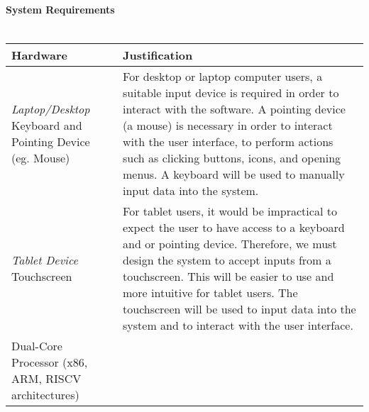 \documentclass[../../../main.tex]{subfiles}
\begin{document}
\paragraph{System Requirements\\\\}

\begin{tabular}{ |p{}|p{}| }
    \hline
    \textbf{Hardware}                                    & \textbf{Justification}                                                                                                                                                                                                                                                   \\
    \hline
    \textit{Laptop/Desktop}\newline
    Keyboard and Pointing Device (eg. Mouse)             &
    For desktop or laptop computer users, a suitable input device is required in order to interact with the software.\newline
    A pointing device (a mouse) is necessary in order to interact with the user interface, to perform actions such as clicking buttons, icons, and opening menus.\newline
    A keyboard will be used to manually input data into the system.                                                                                                                                                                                                                                                                 \\
    \hline
    \textit{Tablet Device}\newline
    Touchscreen                                          & For tablet users, it would be impractical to expect the user to have access to a keyboard and or pointing device. Therefore, we must design the system to accept inputs from a touchscreen.\newline
    This will be easier to use and more intuitive for tablet users. \newline
    The touchscreen will be used to input data into the system and to interact with the user interface.                                                                                                                                                                                                                             \\
    \hline
    Dual-Core Processor
    \newline(x86, ARM, RISCV architectures)              &

\end{tabular}
\end{document}
